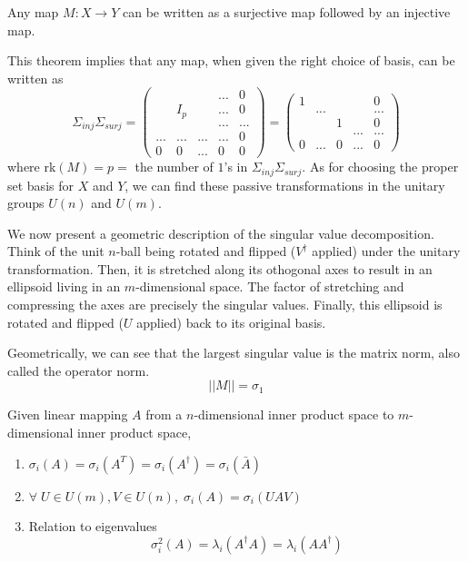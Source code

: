   \begin{theorem}
  Any map $M: X \longrightarrow Y$ can be written as a surjective map followed by an injective map. 
  \end{theorem}

  This theorem implies that any map, when given the right choice of basis, can be written as 
  \[ \Sigma_{inj} \Sigma_{surj} = \begin{pmatrix}
  &&&...&0\\
  &I_p&&...&0\\
  &&&...&...\\
  ...&...&...&...&0\\
  0&0&...&0&0
  \end{pmatrix} = \begin{pmatrix}
  1&&&&0\\
  &...&&&...\\
  &&1&&0\\
  &&&...&...\\
  0&...&0&...&0
  \end{pmatrix}\]
  where rk$(M) = p = $ the number of $1$'s in $\Sigma_{inj} \Sigma_{surj}$. As for choosing the proper set basis for $X$ and $Y$, we can find these passive transformations in the unitary groups $U(n)$ and $U(m)$. 

  We now present a geometric description of the singular value decomposition. Think of the unit $n$-ball being rotated and flipped ($V^\dagger$ applied) under the unitary transformation. Then, it is stretched along its othogonal axes to result in an ellipsoid living in an $m$-dimensional space. The factor of stretching and compressing the axes are precisely the singular values. Finally, this ellipsoid is rotated and flipped ($U$ applied) back to its original basis. 

  \begin{theorem}
  Geometrically, we can see that the largest singular value is the matrix norm, also called the operator norm. 
  \[||M|| = \sigma_1\]
  \end{theorem}

  \begin{theorem} Given linear mapping $A$ from a $n$-dimensional inner product space to $m$-dimensional inner product space, 
  \begin{enumerate}
      \item $\sigma_i(A) = \sigma_i (A^T) = \sigma_i (A^\dagger) = \sigma_i (\bar{A})$
      \item $\forall \; U \in U(m), V \in U(n), \; \sigma_i (A) = \sigma_i (U A V)$
      \item Relation to eigenvalues
  \[\sigma_i^2(A) = \lambda_i (A^\dagger A) = \lambda_i (A A^\dagger)\]
  \end{enumerate}
  \end{theorem}

